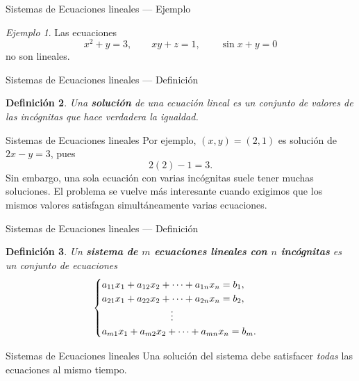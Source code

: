 \documentclass[aspectratio=169,11pt]{beamer}
\newtheorem{definicion}{Definición}[section]
\theoremstyle{remark}
\newtheorem{ejemplo}[definicion]{Ejemplo}
\begin{document}
\begin{frame}[shrink=5]{Sistemas de Ecuaciones lineales — Ejemplo}
\footnotesize
\begin{ejemplo}
Las ecuaciones
\[
x^2+y=3,\qquad xy+z=1,\qquad \sin x+y=0
\]
no son lineales.
\end{ejemplo}
\end{frame}

\begin{frame}[shrink=5]{Sistemas de Ecuaciones lineales — Definición}
\footnotesize
\begin{definicion}
Una \textbf{solución} de una ecuación lineal es un conjunto de valores de las incógnitas que hace verdadera
la igualdad.
\end{definicion}
\end{frame}

\begin{frame}[allowframebreaks]{Sistemas de Ecuaciones lineales}
\footnotesize
Por ejemplo, $(x,y)=(2,1)$ es solución de $2x-y=3$, pues
\[
2(2)-1=3.
\]
Sin embargo, una sola ecuación con varias incógnitas suele tener muchas soluciones. El problema se vuelve
más interesante cuando exigimos que los mismos valores satisfagan simultáneamente varias ecuaciones.
\end{frame}

\begin{frame}[shrink=5]{Sistemas de Ecuaciones lineales — Definición}
\footnotesize
\begin{definicion}
Un \textbf{sistema de $m$ ecuaciones lineales con $n$ incógnitas} es un conjunto de ecuaciones
\[
\begin{cases}
a_{11}x_1+a_{12}x_2+\cdots+a_{1n}x_n=b_1,\\
a_{21}x_1+a_{22}x_2+\cdots+a_{2n}x_n=b_2,\\
\hspace{2.5cm}\vdots\\
a_{m1}x_1+a_{m2}x_2+\cdots+a_{mn}x_n=b_m.
\end{cases}
\]
\end{definicion}
\end{frame}

\begin{frame}[allowframebreaks]{Sistemas de Ecuaciones lineales}
\footnotesize
Una solución del sistema debe satisfacer \emph{todas} las ecuaciones al mismo tiempo.
\end{frame}
\end{document}
